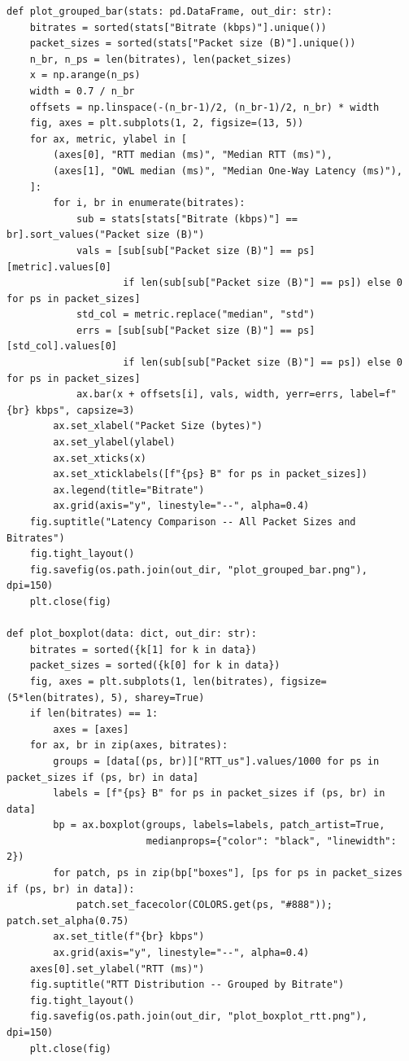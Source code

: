 \begin{lstlisting}[style=appendix-py, caption={Latency vs.\ packet-size plotting}, label={lst:latency-pktsize-plot}]
def plot_grouped_bar(stats: pd.DataFrame, out_dir: str):
    bitrates = sorted(stats["Bitrate (kbps)"].unique())
    packet_sizes = sorted(stats["Packet size (B)"].unique())
    n_br, n_ps = len(bitrates), len(packet_sizes)
    x = np.arange(n_ps)
    width = 0.7 / n_br
    offsets = np.linspace(-(n_br-1)/2, (n_br-1)/2, n_br) * width
    fig, axes = plt.subplots(1, 2, figsize=(13, 5))
    for ax, metric, ylabel in [
        (axes[0], "RTT median (ms)", "Median RTT (ms)"),
        (axes[1], "OWL median (ms)", "Median One-Way Latency (ms)"),
    ]:
        for i, br in enumerate(bitrates):
            sub = stats[stats["Bitrate (kbps)"] == br].sort_values("Packet size (B)")
            vals = [sub[sub["Packet size (B)"] == ps][metric].values[0]
                    if len(sub[sub["Packet size (B)"] == ps]) else 0 for ps in packet_sizes]
            std_col = metric.replace("median", "std")
            errs = [sub[sub["Packet size (B)"] == ps][std_col].values[0]
                    if len(sub[sub["Packet size (B)"] == ps]) else 0 for ps in packet_sizes]
            ax.bar(x + offsets[i], vals, width, yerr=errs, label=f"{br} kbps", capsize=3)
        ax.set_xlabel("Packet Size (bytes)")
        ax.set_ylabel(ylabel)
        ax.set_xticks(x)
        ax.set_xticklabels([f"{ps} B" for ps in packet_sizes])
        ax.legend(title="Bitrate")
        ax.grid(axis="y", linestyle="--", alpha=0.4)
    fig.suptitle("Latency Comparison -- All Packet Sizes and Bitrates")
    fig.tight_layout()
    fig.savefig(os.path.join(out_dir, "plot_grouped_bar.png"), dpi=150)
    plt.close(fig)

def plot_boxplot(data: dict, out_dir: str):
    bitrates = sorted({k[1] for k in data})
    packet_sizes = sorted({k[0] for k in data})
    fig, axes = plt.subplots(1, len(bitrates), figsize=(5*len(bitrates), 5), sharey=True)
    if len(bitrates) == 1:
        axes = [axes]
    for ax, br in zip(axes, bitrates):
        groups = [data[(ps, br)]["RTT_us"].values/1000 for ps in packet_sizes if (ps, br) in data]
        labels = [f"{ps} B" for ps in packet_sizes if (ps, br) in data]
        bp = ax.boxplot(groups, labels=labels, patch_artist=True,
                        medianprops={"color": "black", "linewidth": 2})
        for patch, ps in zip(bp["boxes"], [ps for ps in packet_sizes if (ps, br) in data]):
            patch.set_facecolor(COLORS.get(ps, "#888")); patch.set_alpha(0.75)
        ax.set_title(f"{br} kbps")
        ax.grid(axis="y", linestyle="--", alpha=0.4)
    axes[0].set_ylabel("RTT (ms)")
    fig.suptitle("RTT Distribution -- Grouped by Bitrate")
    fig.tight_layout()
    fig.savefig(os.path.join(out_dir, "plot_boxplot_rtt.png"), dpi=150)
    plt.close(fig)


\end{lstlisting}
